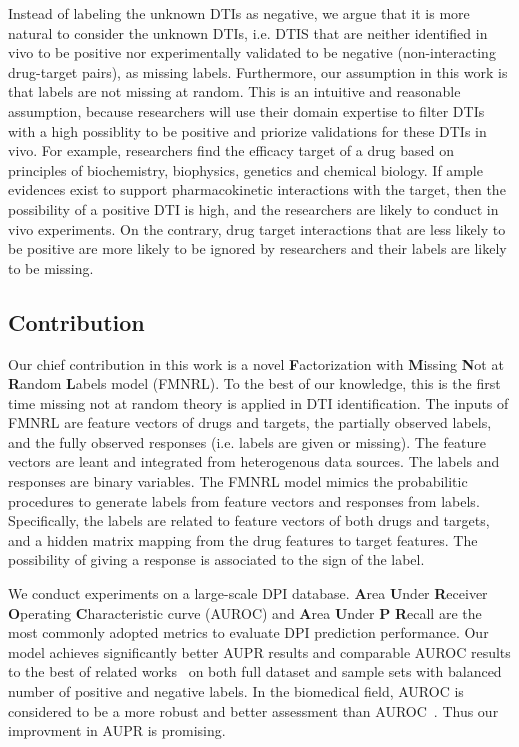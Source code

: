 \documentclass[sigconf,anonymous]{acmart}
\begin{document}
Instead of labeling the unknown DTIs as negative, we argue that it is more natural to consider the unknown DTIs, i.e. DTIS that are neither identified in vivo to be positive nor experimentally validated to be negative (non-interacting drug-target pairs), as missing labels. Furthermore, our assumption in this work is that labels are not missing at random. This is an intuitive and reasonable assumption, because researchers will use their domain expertise to filter DTIs with a high possiblity to be positive and priorize validations for these DTIs in vivo. For example, researchers find the efficacy target of a drug based on principles of biochemistry, biophysics, genetics and chemical biology. If ample evidences exist to support pharmacokinetic interactions with the target, then the possibility of a positive DTI is high, and the researchers are likely to conduct in vivo experiments. On the contrary, drug target interactions that are less likely to be positive are more likely to be ignored by researchers and their labels are likely to be missing.

\subsection{Contribution}
Our chief contribution in this work is a novel \textbf{F}actorization with \textbf{M}issing \textbf{N}ot at \textbf{R}andom \textbf{L}abels model (FMNRL). To the best of our knowledge, this is the first time missing not at random theory is applied in DTI identification. The inputs of FMNRL are feature vectors of drugs and targets, the partially observed labels, and the fully observed responses (i.e. labels are given or missing). The feature vectors are leant and integrated from heterogenous data sources. The labels and responses are binary variables. The FMNRL model mimics the probabilitic procedures to generate labels from feature vectors and responses from labels. Specifically, the labels are related to feature vectors of both drugs and targets, and a hidden matrix mapping from the drug features to target features. The possibility of giving a response is associated to the sign of the label.

We conduct experiments on a large-scale DPI database. \textbf{A}rea \textbf{U}nder \textbf{R}eceiver \textbf{O}perating \textbf{C}haracteristic curve (AUROC) and \textbf{A}rea \textbf{U}nder \textbf{P} \textbf{R}ecall are the most commonly adopted metrics to evaluate DPI prediction performance. Our model achieves significantly better AUPR results and comparable AUROC results to the best of related works~\cite{Luo2017Network} on both full dataset and sample sets with balanced number of positive and negative labels. In the biomedical field, AUROC is considered to be a more robust and better assessment than AUROC~\cite{Luo2017Network}. Thus our improvment in AUPR is promising.
\end{document}
